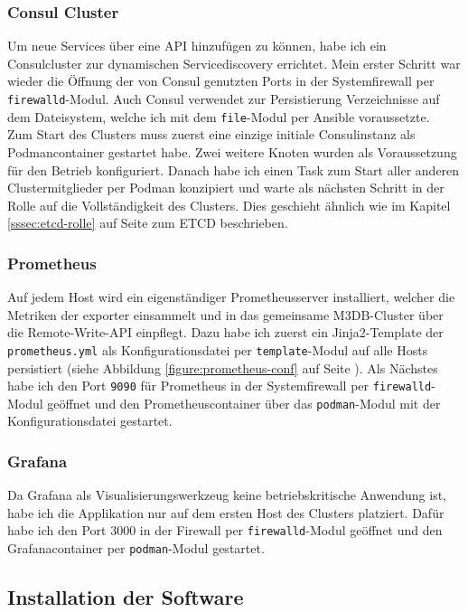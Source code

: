 \documentclass[11pt,a4paper]{article}
\begin{document}
\subsubsection{Consul Cluster}
Um neue Services über eine API hinzufügen zu können, habe ich ein Consulcluster
zur dynamischen Servicediscovery errichtet. Mein erster Schritt war wieder die Öffnung
der von Consul genutzten Ports in der Systemfirewall per \verb|firewalld|-Modul.
Auch Consul verwendet zur Persistierung Verzeichnisse auf dem Dateisystem, welche ich mit
dem \verb|file|-Modul per Ansible voraussetzte. \\
Zum Start des Clusters muss zuerst eine einzige initiale Consulinstanz als Podmancontainer gestartet habe.
Zwei weitere Knoten wurden als Voraussetzung für den Betrieb konfiguriert.
Danach habe ich einen Task zum Start aller anderen Clustermitglieder per Podman
konzipiert und warte als nächsten Schritt in der  Rolle auf die
Vollständigkeit des Clusters. Dies geschieht ähnlich wie im Kapitel \ref{sssec:etcd-rolle}
auf Seite \pageref{sssec:etcd-rolle} zum ETCD beschrieben.
\subsubsection{Prometheus}
Auf jedem Host wird ein eigenständiger Prometheusserver installiert, welcher
die Metriken der \gls{exporter} einsammelt und in das gemeinsame M3DB-Cluster
über die Remote-Write-API einpflegt. Dazu habe ich zuerst
ein Jinja2-Template der \verb|prometheus.yml| als Konfigurationsdatei per \verb|template|-Modul
auf alle Hosts persistiert (siehe Abbildung \ref{figure:prometheus-conf} auf Seite \pageref{figure:prometheus-conf}).
Als Nächstes habe ich den Port \verb|9090| für Prometheus in der Systemfirewall
per \verb|firewalld|-Modul geöffnet und den Prometheuscontainer über das
\verb|podman|-Modul mit der Konfigurationsdatei gestartet. \cite{prometheus}
\subsubsection{Grafana}
Da Grafana als Visualisierungswerkzeug keine betriebskritische Anwendung ist,
habe ich die Applikation nur auf dem ersten Host des Clusters platziert.
Dafür habe ich den Port 3000 in der Firewall per \verb|firewalld|-Modul geöffnet und
den Grafanacontainer per \verb|podman|-Modul gestartet.
\subsection{Installation der Software}
\end{document}
